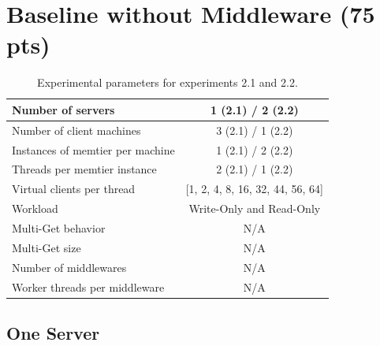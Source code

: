 \section{Baseline without Middleware (75 pts)\label{sec:2}}

    \begin{table}
        \scriptsize{
            \begin{tabular}{|l|c|}
                \hline Number of servers                & 1 (2.1) / 2 (2.2) \\
                \hline Number of client machines        & 3 (2.1) / 1 (2.2) \\
                \hline Instances of memtier per machine & 1 (2.1) / 2 (2.2) \\
                \hline Threads per memtier instance     & 2 (2.1) / 1 (2.2) \\
                \hline Virtual clients per thread       & [1, 2, 4, 8, 16, 32, 44, 56, 64] \\
                \hline Workload                         & Write-Only and Read-Only \\
                \hline Multi-Get behavior               & N/A \\
                \hline Multi-Get size                   & N/A \\
                \hline Number of middlewares            & N/A \\
                \hline Worker threads per middleware    & N/A \\
                \hline
            \end{tabular}
        }
            \caption{Experimental parameters for experiments 2.1 and 2.2.\label{tab:20_setup}}
    \end{table}

    \subsection{One Server\label{subsec:2_one-server}}


